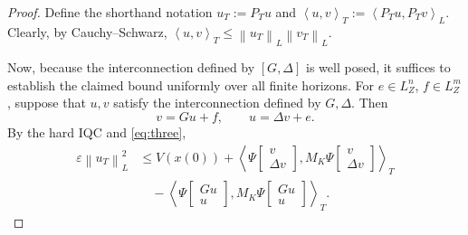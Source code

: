 \documentclass[10pt,twocolumn,letterpaper]{article}
\theoremstyle{definition}
\theoremstyle{plain}
\newcommand{\col}[1]{\begin{bmatrix}#1\end{bmatrix}}
\newcommand{\ip}[2]{\left\langle #1,#2\right\rangle}
\newcommand{\norm}[1]{\left\lVert #1\right\rVert}
\begin{document}
\begin{proof}
Define the shorthand notation $u_T:=P_Tu$ and
$\ip{u}{v}_T:=\ip{P_Tu}{P_Tv}_L$.
Clearly, by Cauchy--Schwarz,
$\ip{u}{v}_T\leq\norm{u_T}_L\norm{v_T}_L$.

Now, because the interconnection defined by $[G,\Delta]$ is well posed,
it suffices to establish the claimed bound uniformly over all finite
horizons. For $e\in L^n_Z$, $f\in L^m_Z$, suppose that $u,v$ satisfy
the interconnection defined by $G,\Delta$. Then
\[
 v=Gu+f,\qquad u=\Delta v+e.
\]
By the hard IQC and \eqref{eq:three},
\begin{align*}
 \varepsilon\norm{u_T}_L^2
 &\leq V(x(0))
  +\ip{\Psi\col{v\\\Delta v}}{M_K\Psi\col{v\\\Delta v}}_T\\
 &\quad-\ip{\Psi\col{Gu\\u}}{M_K\Psi\col{Gu\\u}}_T.
\end{align*}


\end{proof}
\end{document}
